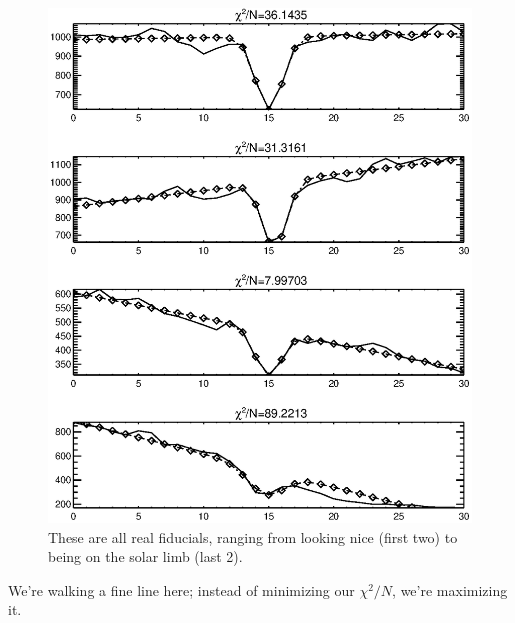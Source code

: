 \documentclass[10pt]{scrartcl}
\begin{document}
\begin{figure}
    \centering
    \includegraphics[width=\linewidth]{../plots_tables_images/gaussfitcomp.eps}
    \caption{These are all real fiducials, ranging from looking nice (first two) to being on the solar limb (last 2).}
\end{figure}

We're walking a fine line here; instead of minimizing our $\chi^2/N$, we're maximizing it.

%
\end{document}
